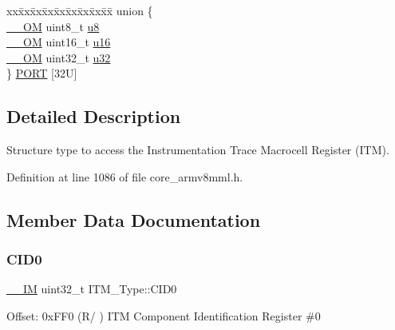 \begin{DoxyCompactItemize}
\begin{tabbing}
\end{tabbing}\item 
\begin{tabbing}
xx\=xx\=xx\=xx\=xx\=xx\=xx\=xx\=xx\=\kill
union \{\\
\>\hyperlink{core__sc300_8h_a0ea2009ed8fd9ef35b48708280fdb758}{\_\_OM} uint8\_t \hyperlink{struct_i_t_m___type_ae773bf9f9dac64e6c28b14aa39f74275}{u8}\\
\>\hyperlink{core__sc300_8h_a0ea2009ed8fd9ef35b48708280fdb758}{\_\_OM} uint16\_t \hyperlink{struct_i_t_m___type_a962a970dfd286cad7f8a8577e87d4ad3}{u16}\\
\>\hyperlink{core__sc300_8h_a0ea2009ed8fd9ef35b48708280fdb758}{\_\_OM} uint32\_t \hyperlink{struct_i_t_m___type_a5834885903a557674f078f3b71fa8bc8}{u32}\\
\} \hyperlink{struct_i_t_m___type_a826cda05b7aa0b6c6554793aba67d954}{PORT} \mbox{[}32U\mbox{]}\\

\end{tabbing}\end{DoxyCompactItemize}


\subsection{Detailed Description}
Structure type to access the Instrumentation Trace Macrocell Register (I\+TM). 

Definition at line 1086 of file core\+\_\+armv8mml.\+h.



\subsection{Member Data Documentation}
\mbox{\label{struct_i_t_m___type_a30bb2b166b1723867da4a708935677ba}} 
\subsubsection{\texorpdfstring{C\+I\+D0}{CID0}}
{\footnotesize\ttfamily \hyperlink{core__sc300_8h_a4cc1649793116d7c2d8afce7a4ffce43}{\+\_\+\+\_\+\+IM} uint32\+\_\+t I\+T\+M\+\_\+\+Type\+::\+C\+I\+D0}

Offset\+: 0x\+F\+F0 (R/ ) I\+TM Component Identification Register \#0 


